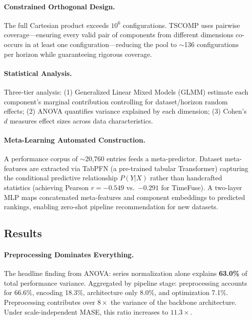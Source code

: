 \documentclass[11pt,a4paper]{article}
\begin{document}
\paragraph{Constrained Orthogonal Design.} The full Cartesian product exceeds $10^6$ configurations. TSCOMP uses pairwise coverage---ensuring every valid pair of components from different dimensions co-occurs in at least one configuration---reducing the pool to $\sim$136 configurations per horizon while guaranteeing rigorous coverage.

\paragraph{Statistical Analysis.} Three-tier analysis: (1) Generalized Linear Mixed Models (GLMM) estimate each component's marginal contribution controlling for dataset/horizon random effects; (2) ANOVA quantifies variance explained by each dimension; (3) Cohen's $d$ measures effect sizes across data characteristics.

\paragraph{Meta-Learning Automated Construction.} A performance corpus of $\sim$20,760 entries feeds a meta-predictor. Dataset meta-features are extracted via TabPFN (a pre-trained tabular Transformer) capturing the conditional predictive relationship $P(Y|X)$ rather than handcrafted statistics (achieving Pearson $r = -0.549$ vs.\ $-0.291$ for TimeFuse). A two-layer MLP maps concatenated meta-features and component embeddings to predicted rankings, enabling zero-shot pipeline recommendation for new datasets.

\subsection{Results}

\paragraph{Preprocessing Dominates Everything.} The headline finding from ANOVA: series normalization alone explains \textbf{63.0\%} of total performance variance. Aggregated by pipeline stage: preprocessing accounts for 66.6\%, encoding 18.3\%, architecture only 8.0\%, and optimization 7.1\%. Preprocessing contributes over $8\times$ the variance of the backbone architecture. Under scale-independent MASE, this ratio increases to $11.3\times$.
\end{document}
